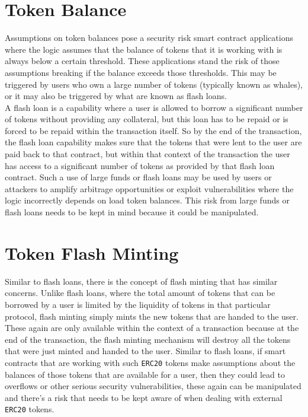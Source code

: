 \section{Token Balance}
Assumptions on token balances pose a security risk smart contract applications where the logic assumes that the balance of tokens that it is working with is always below a certain threshold. These applications stand the risk of those assumptions breaking if the balance exceeds those thresholds. This may be triggered by users who own a large number of tokens (typically known as whales), or it may also be triggered by what are known as flash loans.\\

A flash loan is a capability where a user is allowed to borrow a significant number of tokens without providing any collateral, but this loan has to be repaid or is forced to be repaid within the transaction itself. So by the end of the transaction, the flash loan capability makes sure that the tokens that were lent to the user are paid back to that contract, but within that context of the transaction the user has access to a significant number of tokens as provided by that flash loan contract. Such a use of large funds or flash loans may be used by users or attackers to amplify arbitrage opportunities or exploit vulnerabilities where the logic incorrectly depends on load token balances. This risk from large funds or flash loans needs to be kept in mind because it could be manipulated.

\section{Token Flash Minting}
Similar to flash loans, there is the concept of flash minting that has similar concerns. Unlike flash loans, where the total amount of tokens that can be borrowed by a user is limited by the liquidity of tokens in that particular protocol, flash minting simply mints the new tokens that are handed to the user. These again are only available within the context of a transaction because at the end of the transaction, the flash minting mechanism will destroy all the tokens that were just minted and handed to the user. Similar to flash loans, if smart contracts that are working with such \verb|ERC20| tokens make assumptions about the balances of those tokens that are available for a user, then they could lead to overflows or other serious security vulnerabilities, these again can be manipulated and there's a risk that needs to be kept aware of when dealing with external \verb|ERC20| tokens.


